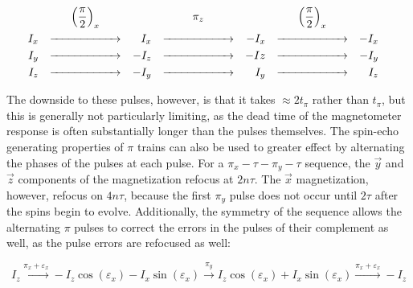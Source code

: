 \documentclass[PaulGanssle-Thesis.tex]{subfiles}
\begin{document}
\begin{align*}
\label{eqn:PiZPulseEffect}
      && \specialcell{\hfill{}\left(\frac{\pi}{2}\right)_{x}\hfill{}} &&                  && \specialcell{\hfill{}\pi_{z}\hfill{}}  &&                  && \specialcell{\hfill{}\left(\frac{\pi}{2}\right)_{x}\hfill{}} &&& \\
I_{x} && \xrightarrow{\hspace*{2cm}}                                && \phantom{-}I_{x} && \xrightarrow{\hspace*{2cm}}          && -I_{x}           && \xrightarrow{\hspace*{2cm}}     && -I_{x}           &\\
I_{y} && \xrightarrow{\hspace*{2cm}}                                && -I_{z}           && \xrightarrow{\hspace*{2cm}}          && -I{z}            && \xrightarrow{\hspace*{2cm}}     && -I_{y}           & \\
I_{z} && \xrightarrow{\hspace*{2cm}}                                && -I_{y}           && \xrightarrow{\hspace*{2cm}}          && \phantom{-}I_{y} && \xrightarrow{\hspace*{2cm}}     && \phantom{-}I_{z} &                                    
\end{align*}

The downside to these pulses, however, is that it takes $\approx 2 t_{\pi}$ rather than $t_{\pi}$, but this is generally not particularly limiting, as the dead time of the magnetometer response is often substantially longer than the pulses themselves. The spin-echo generating properties of $\pi$ trains can also be used to greater effect by alternating the phases of the pulses at each pulse. For a $\pi_{x}-\tau-\pi_{y}-\tau$ sequence, the $\vec{y}$ and $\vec{z}$ components of the magnetization refocus at $2n\tau$. The $\vec{x}$ magnetization, however, refocus on $4n\tau$, because the first $\pi_{y}$ pulse does not occur until $2\tau$ after the spins begin to evolve. Additionally, the symmetry of the sequence allows the alternating $\pi$ pulses to correct the errors in the pulses of their complement as well, as the pulse errors are refocused as well:

\begin{equation}
I_{z} \xrightarrow{\pi_{x} + \varepsilon_{x}} -I_{z}\cos\left(\varepsilon_{x}\right)-I_{x}\sin\left(\varepsilon_{x}\right)\xrightarrow{\pi_{y}}I_{z}\cos\left(\varepsilon_{x}\right) + I_{x}\sin\left(\varepsilon_{x}\right) \xrightarrow{\pi_{x}+\varepsilon_{x}} -I_{z}
\label{eqn:PulseErrorCorrection}
\end{equation}
\end{document}
